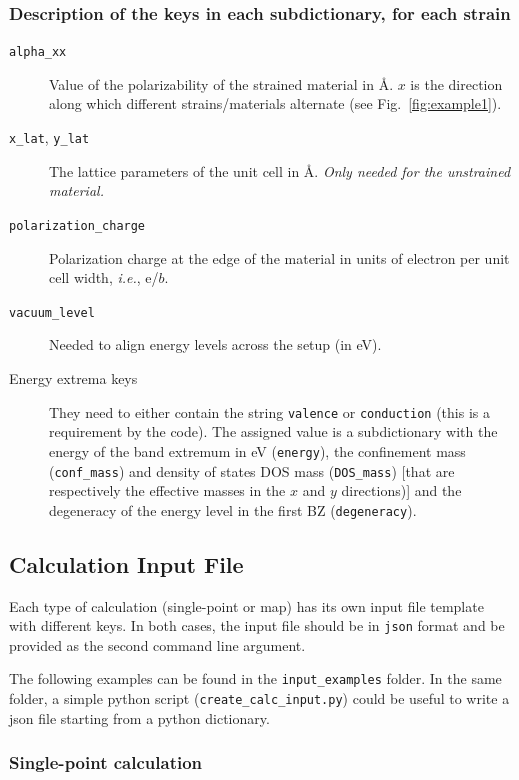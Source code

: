 \documentclass[a4paper,12pt]{article}
\newcommand{\angstrom}{\textup{\AA}}
\begin{document}
\subsubsection*{Description of the keys in each subdictionary, for each strain}
\begin{description}
\item[\texttt{alpha\_xx}] Value of the polarizability of the strained material in \angstrom. $x$ is the direction along which different strains/materials alternate (see Fig.~\ref{fig:example1}).

\item[\texttt{x\_lat}, \texttt{y\_lat}] The lattice parameters of the unit cell in \angstrom. \emph{Only needed for the unstrained material.}

\item[\texttt{polarization\_charge}] Polarization charge at the edge of the material in units of electron per unit cell width, \textit{i.e.}, e/$b$.

\item[\texttt{vacuum\_level}] Needed to align energy levels across the setup (in eV).

\item[Energy extrema keys] They need to either contain the string \texttt{valence} or \texttt{conduction} (this is a requirement by the code). The assigned value is a subdictionary with the energy of the band extremum in eV (\texttt{energy}), the confinement mass (\texttt{conf\_mass}) and density of states DOS mass (\texttt{DOS\_mass}) [that are respectively the effective masses in the $x$ and $y$ directions)] and the degeneracy of the energy level in the first BZ (\texttt{degeneracy}).
\end{description}


\subsection{Calculation Input File}
Each type of calculation (single-point or map) has its own input file template with different keys. In both cases, the input file should be in \texttt{json} format and be provided as the second command line argument. 

The following examples can be found in the \texttt{input\_examples} folder. In the same folder, a simple python script (\texttt{create\_calc\_input.py}) could be useful to write a json file starting from a python dictionary.

\subsubsection{Single-point calculation}
\end{document}
